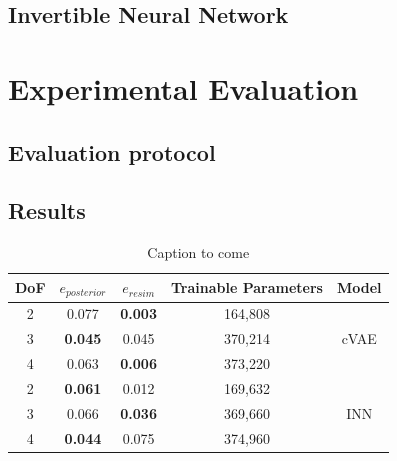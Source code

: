 \documentclass[conference]{IEEEtran}
\begin{document}
\subsection*{Invertible Neural Network}

\section*{Experimental Evaluation}

\subsection*{Evaluation protocol}
\subsection*{Results}

\begin{table}[h]
\centering
\begin{tabular}{|c|c|c|c|c|}
\hline
 DoF & $e_{posterior}$ & $e_{resim}$ & Trainable Parameters & Model \\
 \hline
 2  & 0.077 & \textbf{0.003} & 164,808 & \\
 3  & \textbf{0.045} & 0.045 & 370,214 & cVAE \\
 4  & 0.063 & \textbf{0.006} & 373,220 & \\
 \hline
 2  & \textbf{0.061} & 0.012 & 169,632 & \\
 3  & 0.066 & \textbf{0.036} & 369,660 & INN \\
 4  & \textbf{0.044} & 0.075 & 374,960 & \\
 \hline
\end{tabular}
\caption{\label{tab:results} Caption to come}
\end{table}
\end{document}
